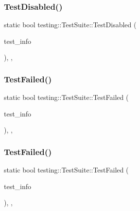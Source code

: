 \mbox{\label{classtesting_1_1_test_suite_a01cf264bd705388df0778160ed433b93}} 
\subsubsection{\texorpdfstring{TestDisabled()}{TestDisabled()}\hspace{0.1cm}{\footnotesize\ttfamily [2/2]}}
{\footnotesize\ttfamily static bool testing\+::\+Test\+Suite\+::\+Test\+Disabled (\begin{DoxyParamCaption}\item[{const \mbox{\hyperlink{classtesting_1_1_test_info}{Test\+Info}} $\ast$}]{test\+\_\+info }\end{DoxyParamCaption})\hspace{0.3cm}{\ttfamily [inline]}, {\ttfamily [static]}, {\ttfamily [private]}}

\mbox{\label{classtesting_1_1_test_suite_ae4a91afa37c495d36bf30dd9d6cf0e9c}} 
\subsubsection{\texorpdfstring{TestFailed()}{TestFailed()}\hspace{0.1cm}{\footnotesize\ttfamily [1/2]}}
{\footnotesize\ttfamily static bool testing\+::\+Test\+Suite\+::\+Test\+Failed (\begin{DoxyParamCaption}\item[{const \mbox{\hyperlink{classtesting_1_1_test_info}{Test\+Info}} $\ast$}]{test\+\_\+info }\end{DoxyParamCaption})\hspace{0.3cm}{\ttfamily [inline]}, {\ttfamily [static]}, {\ttfamily [private]}}

\mbox{\label{classtesting_1_1_test_suite_ae4a91afa37c495d36bf30dd9d6cf0e9c}} 
\subsubsection{\texorpdfstring{TestFailed()}{TestFailed()}\hspace{0.1cm}{\footnotesize\ttfamily [2/2]}}
{\footnotesize\ttfamily static bool testing\+::\+Test\+Suite\+::\+Test\+Failed (\begin{DoxyParamCaption}\item[{const \mbox{\hyperlink{classtesting_1_1_test_info}{Test\+Info}} $\ast$}]{test\+\_\+info }\end{DoxyParamCaption})\hspace{0.3cm}{\ttfamily [inline]}, {\ttfamily [static]}, {\ttfamily [private]}}

